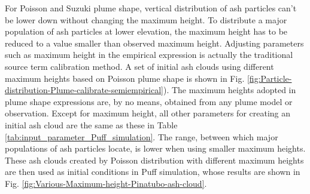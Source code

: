 \documentclass[draft,linenumbers]{agujournal2019}
\begin{document}
For Poisson and Suzuki plume shape, vertical distribution of ash particles can't be lower down without changing the maximum height. To distribute a major population of ash particles at lower elevation, the maximum height has to be reduced to a value smaller than observed maximum height. Adjusting parameters such as maximum height in the empirical expression is actually the traditional source term calibration method. A set of initial ash clouds using different maximum heights based on Poisson plume shape is shown in Fig. \ref{fig:Particle-distribution-Plume-calibrate-semiempirical}). The maximum heights adopted in plume shape expressions are, by no means, obtained from any plume model or observation. Except for maximum height, all other parameters for creating an initial ash cloud are the same as these in Table \ref{tab:input_parameter_Puff_simulation}. The range, between which major populations of ash particles locate, is lower when using smaller maximum heights. These ash clouds created by Poisson distribution with different maximum heights are then used as initial conditions in Puff simulation, whose results are shown in Fig. \ref{fig:Various-Maximum-height-Pinatubo-ash-cloud}.
\end{document}
